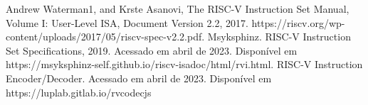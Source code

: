 \documentclass[a4paper, 12pt, fleqn]{article}
\begin{document}
	
	 \selectfont    %
	\onehalfspacing                 %
	
	
	
	\renewcommand{\contentsname}{Índice} %
	\tableofcontents                    \newpage
	
	\renewcommand{\nomname}{Nomenclatura} %
	\printnomenclature                  \newpage
		

	
	
	
	
	
	
	

	\begin{thebibliography}{99}
		 Andrew Waterman1, and Krste Asanovi, The RISC-V Instruction Set Manual, Volume I: User-Level ISA, Document Version 2.2, 2017. https://riscv.org/wp-content/uploads/2017/05/riscv-spec-v2.2.pdf.
		 Msyksphinz. RISC-V Instruction Set Specifications, 2019. Acessado em abril de 2023. Disponível em https://msyksphinz-self.github.io/riscv-isadoc/html/rvi.html.
		 RISC-V Instruction Encoder/Decoder. Acessado em abril de 2023. Disponível em https://luplab.gitlab.io/rvcodecjs
	\end{thebibliography}
\end{document}
